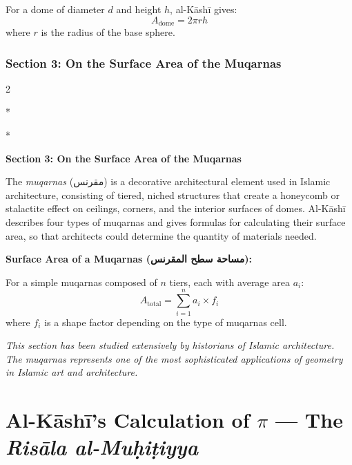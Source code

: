 \documentclass[11pt,a4paper]{article}
\newcommand{\cnote}[1]{\textcolor{notecolor}{\textit{#1}}}
\newcommand{\ar}[1]{{\arabicfont\beginR #1\endR}}
\newenvironment{bilingual}{%
  \vspace{0.3em}%
  \begin{paracol}{2}%
}{%
  \end{paracol}%
  \vspace{0.3em}%
}
\newenvironment{mathalgo}{%
  \par\vspace{0.3cm}
  \begin{framed}
  \setlength{\parindent}{0pt}
}{%
  \end{framed}
  \par\vspace{0.3cm}
}
\begin{document}
For a dome of diameter $d$ and height $h$, al-K\=ash\=i gives:
\[
A_{\text{dome}} = 2\pi r h
\]
where $r$ is the radius of the base sphere.

\subsubsection{Section 3: On the Surface Area of the Muqarnas}

\begin{bilingual}
\switchcolumn[0]*
\begin{center}
\textbf{\color{chapcolor}\ar{فصل في مساحة سطح المقرنس}}
\end{center}
\switchcolumn[1]*
\begin{center}
\textbf{\color{chapcolor}Section 3: On the Surface Area of the Muqarnas}
\end{center}
\end{bilingual}

The \textit{muqarnas} (\ar{مقرنس}) is a decorative architectural
element used in Islamic architecture, consisting of tiered, niched
structures that create a honeycomb or stalactite effect on ceilings,
corners, and the interior surfaces of domes. Al-K\=ash\=i describes four
types of muqarnas and gives formulas for calculating their surface area,
so that architects could determine the quantity of materials needed.

\begin{mathalgo}
\textbf{Surface Area of a Muqarnas (\ar{مساحة سطح المقرنس}):}

For a simple muqarnas composed of $n$ tiers, each with average area
$a_i$:
\[
A_{\text{total}} = \sum_{i=1}^{n} a_i \times f_i
\]
where $f_i$ is a shape factor depending on the type of muqarnas cell.
\end{mathalgo}

\cnote{This section has been studied extensively by historians of
Islamic architecture. The muqarnas represents one of the most
sophisticated applications of geometry in Islamic art and architecture.}
\clearpage

\section{Al-K\=ash\=i's Calculation of $\pi$ --- The \textit{Ris\=ala al-Mu\d{h}i\d{t}iyya}}
\label{sec:picalc}
\end{document}
